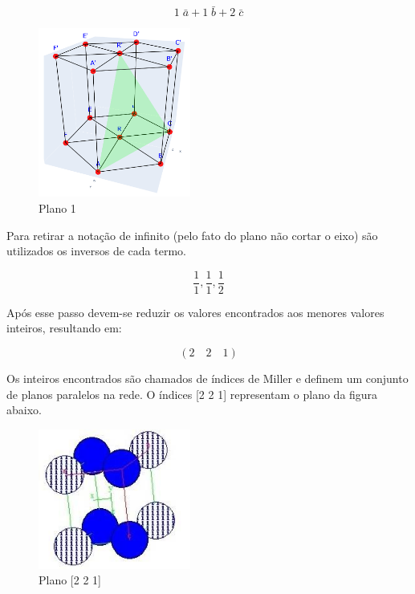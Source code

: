 \documentclass[10pt,twocolumn,letterpaper]{article}
\begin{document}
\vspace{-0.25cm}

\begin{equation*}
    1\;\bar{a} + 1\;\bar{b} + 2\;\bar{c}
\end{equation*}

\vspace{-0.25cm}

\begin{figure}[h]
    \centering
    \includegraphics[width=5cm]{Plano1.png}
    \caption{Plano 1}
    \label{fig:label}
\end{figure}

\hspace{1cm} Para retirar a notação de infinito (pelo fato do plano não cortar o eixo) são utilizados os inversos de cada termo.

\vspace{-0.15cm}

\begin{equation*}
    \frac{1}{1}, \frac{1}{1}, \frac{1}{2}
\end{equation*}

\hspace{1cm} Após esse passo devem-se reduzir os valores encontrados aos menores valores inteiros, resultando em:

\vspace{-0.25cm}

\begin{equation*}
    (2 \quad 2 \quad 1)
\end{equation*}

\hspace{1cm} Os inteiros encontrados são chamados de índices de Miller e definem um conjunto de planos paralelos na rede. O índices [2 2 1] representam o plano da figura abaixo. 

\begin{figure}[h]
    \centering
    \includegraphics[width=5cm]{fig3.jpg}
    \caption{Plano [2 2 1]}
    \label{fig:label}
\end{figure}
\end{document}
